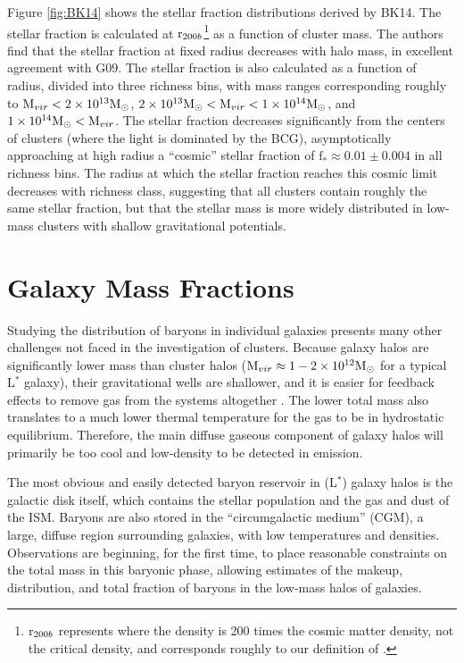 Figure \ref{fig:BK14} shows the stellar fraction distributions derived
by BK14.  The stellar fraction is calculated at
$\textrm{r}{}_{200b}$\footnote{$\textrm{r}{}_{200b}$ represents where the
  density is 200 times the cosmic matter density, not the critical
  density, and corresponds roughly to our definition of \rvir{}.} as a
function of cluster mass. The authors find that the stellar fraction
at fixed radius decreases with halo mass, in excellent agreement with
G09. The stellar fraction is also calculated as a function of radius,
divided into three richness bins, with mass ranges corresponding
roughly to $\textrm{M\ensuremath{_{vir}}}{}< 2\times 10^{13}\textrm{M}_\odot$, $2\times 10^{13}\textrm{M}_\odot{} < \textrm{M\ensuremath{_{vir}}}{}
< 1\times 10^{14}\textrm{M}_\odot{}$, and $1\times 10^{14}\textrm{M}_\odot{} < \textrm{M\ensuremath{_{vir}}}{}$. The stellar
fraction decreases significantly from the centers of clusters (where
the light is dominated by the BCG), asymptotically approaching at high
radius a ``cosmic'' stellar fraction of $\textrm{f}_{*} \approx 0.01
\pm 0.004$ in all richness bins. The radius at which the stellar
fraction reaches this cosmic limit decreases with richness class,
suggesting that all clusters contain roughly the same stellar
fraction, but that the stellar mass is more widely distributed in
low-mass clusters with shallow gravitational potentials.



\section{Galaxy Mass Fractions}
\label{sec:Galaxy}

Studying the distribution of baryons in individual galaxies presents
many other challenges not faced in the investigation of
clusters. Because galaxy halos are significantly lower mass than
cluster halos ($\textrm{M\ensuremath{_{vir}}} \approx 1-2\times 10^{12} \textrm{M}_\odot{}$ for a typical
L$^*$ galaxy), their gravitational wells are shallower, and it is
easier for feedback effects to remove gas from the systems altogether
. The lower total mass also translates to a
much lower thermal temperature for the gas to be in hydrostatic
equilibrium. Therefore, the main diffuse gaseous component of galaxy halos
will primarily be too cool and low-density to be detected in
emission. 

The most obvious and easily detected baryon reservoir in (L$^*$)
galaxy halos is the galactic disk itself, which contains the stellar
population and the gas and dust of the ISM. Baryons are also stored
in the ``circumgalactic medium'' (CGM), a large, diffuse region
surrounding galaxies, with low temperatures and
densities. Observations are beginning, for the first time, to place
reasonable constraints on the total mass in this baryonic phase,
allowing estimates of the makeup, distribution, and total fraction of
baryons in the low-mass halos of galaxies. 

